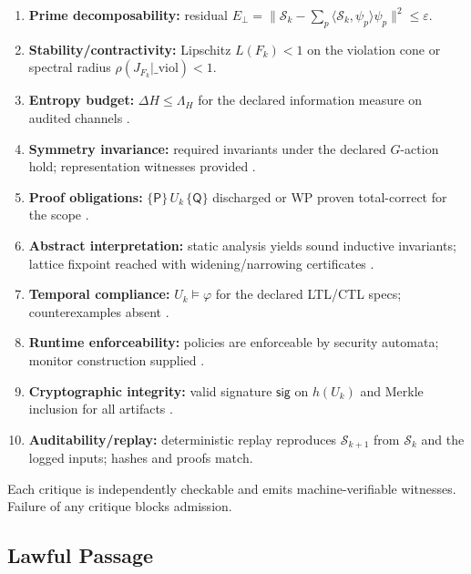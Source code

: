 \documentclass[12pt]{amsart}
\theoremstyle{plain}
\begin{document}
\begin{enumerate}
  \item[\textbf{Crit\,$_0$}] \textbf{Prime decomposability:} residual $E_\perp=\big\|\mathcal{S}_k-\sum_p\langle\mathcal{S}_k,\psi_p\rangle\psi_p\big\|^2\le\varepsilon$.
  \item[\textbf{Crit\,$_1$}] \textbf{Stability/contractivity:} Lipschitz $L(F_k)<1$ on the violation cone or spectral radius $\rho(J_{F_k}|\_\text{viol})<1$.
  \item[\textbf{Crit\,$_2$}] \textbf{Entropy budget:} $\Delta H \le \Lambda_H$ for the declared information measure on audited channels \cite{cover2006elements}.
  \item[\textbf{Crit\,$_3$}] \textbf{Symmetry invariance:} required invariants under the declared $G$-action hold; representation witnesses provided \cite{serre1977linear}.
  \item[\textbf{Crit\,$_4$}] \textbf{Proof obligations:} $\{\mathsf{P}\}\,U_k\,\{\mathsf{Q}\}$ discharged or WP proven total-correct for the scope \cite{hoare1969axiomatic,dijkstra1976discipline}.
  \item[\textbf{Crit\,$_5$}] \textbf{Abstract interpretation:} static analysis yields sound inductive invariants; lattice fixpoint reached with widening/narrowing certificates \cite{cousot1977abstract}.
  \item[\textbf{Crit\,$_6$}] \textbf{Temporal compliance:} $U_k\models\varphi$ for the declared LTL/CTL specs; counterexamples absent \cite{clarke1999model,lamport2002specifying}.
  \item[\textbf{Crit\,$_7$}] \textbf{Runtime enforceability:} policies are enforceable by security automata; monitor construction supplied \cite{schneider2000enforceable}.
  \item[\textbf{Crit\,$_8$}] \textbf{Cryptographic integrity:} valid signature $\mathsf{sig}$ on $h(U_k)$ and Merkle inclusion for all artifacts \cite{merkle1989certified,goldreich2001foundations}.
  \item[\textbf{Crit\,$_9$}] \textbf{Auditability/replay:} deterministic replay reproduces $\mathcal{S}_{k+1}$ from $\mathcal{S}_{k}$ and the logged inputs; hashes and proofs match.
\end{enumerate}

Each critique is independently checkable and emits machine-verifiable witnesses. Failure of any critique blocks admission.

\subsection{Lawful Passage}
\end{document}
